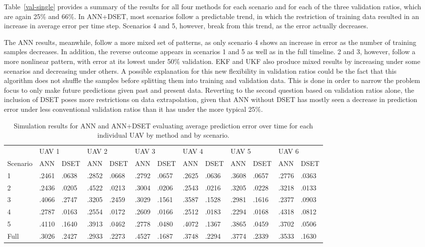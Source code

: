 \documentclass[12pt]{uthesis-v12}  %
\begin{document}
Table~\ref{val-single} provides a summary of the results for all four methods for each scenario and for each of the three validation ratios, which are again 25\% and 66\%. In ANN+DSET, most scenarios follow a predictable trend, in which the restriction of training data resulted in an increase in average error per time step. Scenarios 4 and 5, however, break from this trend, as the error actually decreases.

The ANN results, meanwhile, follow a more mixed set of patterns, as only scenario 4 shows an increase in error as the number of training samples decreases. In addition, the reverse outcome appears in scenarios 1 and 5 as well as in the full timeline. 2 and 3, however, follow a more nonlinear pattern, with error at its lowest under 50\% validation. EKF and UKF also produce mixed results by increasing under some scenarios and decreasing under others. A possible explanation for this new flexibility in validation ratios could be the fact that this algorithm does not shuffle the samples before splitting them into training and validation data. This is done in order to narrow the problem focus to only make future predictions given past and present data. Reverting to the second question based on validation ratios alone, the inclusion of DSET poses more restrictions on data extrapolation, given that ANN without DSET has mostly seen a decrease in prediction error under less conventional validation ratios than it has under the more typical 25\%.

\begin{table}[!t]
\caption{Simulation results for ANN and ANN+DSET evaluating average prediction error over time for each individual UAV by method and by scenario.}
\renewcommand{\arraystretch}{1.3}
\centering
\resizebox{\textwidth}{!}
{\begin{tabular}{*{13}{l}}
\toprule
& \multicolumn{2}{l}{UAV 1} & \multicolumn{2}{l}{UAV 2} & \multicolumn{2}{l}{UAV 3} & \multicolumn{2}{l}{UAV 4} & \multicolumn{2}{l}{UAV 5} & \multicolumn{2}{l}{UAV 6} \\
Scenario & ANN & DSET & ANN & DSET & ANN & DSET & ANN & DSET & ANN & DSET & ANN & DSET \\ \midrule
1 & .2461 & .0638 & .2852 & .0668 & .2792 & .0657 & .2625 & .0636 & .3608 & .0657 & .2776 & .0363 \\
2 & .2436 & .0205 & .4522 & .0213 & .3004 & .0206 & .2543 & .0216 & .3205 & .0228 & .3218 & .0133 \\
3 & .4066 & .2747 & .3205 & .2459 & .3029 & .1561 & .3587 & .1528 & .2981 & .1616 & .2377 & .0903 \\
4 & .2787 & .0163 & .2554 & .0172 & .2609 & .0166 & .2512 & .0183 & .2294 & .0168 & .4318 & .0812 \\
5 & .4110 & .1640 & .3913 & .0462 & .2778 & .0480 & .4072 & .1367 & .3865 & .0459 & .3702 & .0506 \\
Full & .3026 & .2427 & .2933 & .2273 & .4527 & .1687 & .3748 & .2294 & .3774 & .2339 & .3533 & .1630 \\
\bottomrule
\end{tabular}}

\label{each-uav}
\end{table}
\end{document}
